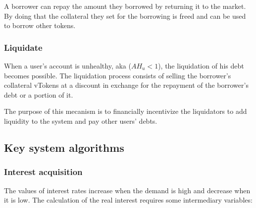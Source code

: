A borrower can repay the amount they borrowed by returning it to the market. By doing that the collateral they set for the borrowing is freed and can be used to borrow other tokens.

\subsubsection{Liquidate}
When a user's account is unhealthy, aka ($AH_u < 1$), the liquidation of his debt becomes possible. The liquidation process consists of selling the borrower's collateral vTokens at a discount in exchange for the repayment of the borrower's debt or a portion of it.

The purpose of this mecanism is to financially incentivize the liquidators to add liquidity to the system and pay other users' debts.

\subsection{Key system algorithms}

\subsubsection{Interest acquisition}

The values of interest rates increase when the demand is high and decrease when it is low. The calculation of the real interest requires some intermediary variables:

